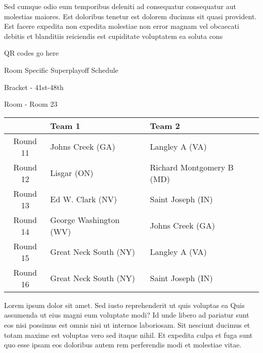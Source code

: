 \documentclass{article}%
\begin{document}
\newline%
    Sed cumque odio eum temporibus deleniti ad consequatur consequatur aut molestias maiores. Est doloribus tenetur est dolorem ducimus sit quasi provident. Est facere expedita non expedita molestiae non error magnam vel obcaecati debitis et blanditiis reiciendis est cupiditate voluptatem ea soluta cons%
\vspace*{140pt}%
\begin{center}%
\begin{Huge}%
QR codes go here%
\end{Huge}%
\end{center}%
\newpage%
\begin{center}%
\begin{Huge}%
Room Specific Superplayoff Schedule%
\end{Huge}%
\vspace*{8pt}%
\linebreak%
\begin{Large}%
Bracket {-} 41st{-}48th%
\end{Large}%
\vspace*{8pt}%
\linebreak%
\vspace*{8pt}%
\begin{Large}%
Room {-} Room 23%
\end{Large}%
\end{center}%
%
\begin{tabularx}{\textwidth}{|c|Y|Y|}%
\hline%
&Team 1&Team 2\\%
\hline%
Round 11&Johns Creek (GA)&Langley A (VA)\\%
Round 12&Lisgar (ON)&Richard Montgomery B (MD)\\%
Round 13&Ed W. Clark (NV)&Saint Joseph (IN)\\%
Round 14&George Washington (WV)&Johns Creek (GA)\\%
Round 15&Great Neck South (NY)&Langley A (VA)\\%
Round 16&Great Neck South (NY)&Saint Joseph (IN)\\%
\hline%
\end{tabularx}%
\vspace*{8pt}%
\newline%
    Lorem ipsum dolor sit amet. Sed iusto reprehenderit ut quis voluptas ea Quis assumenda ut eius magni eum voluptate modi? Id unde libero ad pariatur sunt eos nisi possimus est omnis nisi ut internos laboriosam. Sit nesciunt ducimus et totam maxime est voluptas vero sed itaque nihil. Et expedita culpa et fuga sunt quo esse ipsam eos doloribus autem rem perferendis modi et molestiae vitae.\newline%
\end{document}
